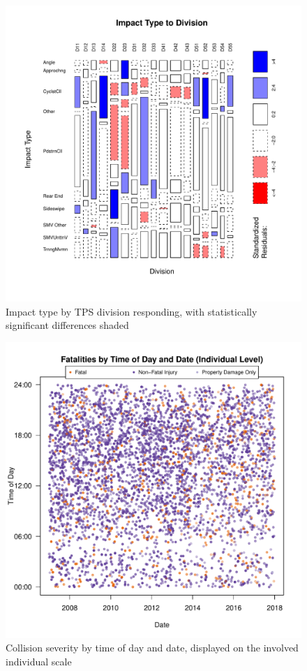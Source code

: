 \documentclass{article}
\begin{document}
\begin{figure}[!h]
	\begin{center}
		\includegraphics[scale = 1]{impactDivision}
		\caption{Impact type by TPS division responding, with statistically significant differences shaded}
		\label{fig:impactdivision}
	\end{center}
\end{figure}

\begin{figure}[!h]
	\begin{center}
		\includegraphics[scale = 1]{timedayind}
		\caption{Collision severity by time of day and date, displayed on the involved individual scale}
		\label{fig:timedayind}
	\end{center}
\end{figure}
\end{document}
